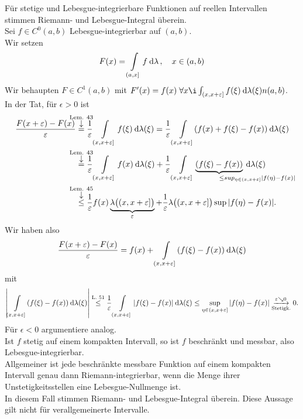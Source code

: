\documentclass[skript.tex]{subfiles}
\begin{document}
	\begin{bem}
		Für stetige und Lebesgue-integrierbare Funktionen auf reellen Intervallen stimmen
		Riemann- und Lebesgue-Integral überein. \\
		Sei $f \in C^0 (a,b)$ Lebesgue-integrierbar auf $(a,b)$. \\
		Wir setzen
		\[
			F(x) = \int\limits_{(a,x]} f \: \mathrm{d}\lambda\,, \quad x \in (a,b)
		\]
		Wir behaupten $F \in C^1(a,b)$ mit $F'(x) = f(x) \; \forall x \i\int_{(x,x+\epsilon]} f(\xi) \md \lambda(\xi)n (a,b)$. \\ 
		In der Tat, für $\epsilon > 0$ ist
		\begin{align*}
			\frac{F(x+\epsilon)-F(x)}{\epsilon} &\darrow{\text{Lem. 43}}{=}
			\frac{1}{\epsilon} \lint_{(x,x+\epsilon]} f(\xi) \md \lambda(\xi)
			= \frac{1}{\epsilon} \lint_{(x,x+\epsilon]} (f(x)+f(\xi)-f(x)) \md \lambda(\xi)
			\\ &\darrow{\text{Lem. 43}}{=}
			\frac{1}{\epsilon}\lint_{(x,x+\epsilon]} f(x) \md \lambda(\xi)
			+ \frac{1}{\epsilon}\lint_{(x,x+\epsilon]} 
			\underbrace{(f(\xi)-f(x))}_{
				\mathrlap{
					\leq sup_{\eta\in(x,x+\epsilon]} |f(\eta)-f(x)|
				}
			}
			\md \lambda(\xi) \\
			&\darrow{\text{Lem. 45}}{\leq}
			\frac{1}{\epsilon} f(x)
			\underbrace{\lambda\big((x,x+\epsilon]\big)}_\epsilon
			+ \frac{1}{\epsilon} \lambda\big((x,x+\epsilon]\big) \sup | f(\eta)-f(x)|.
		\end{align*}
		Wir haben also
		\[
			\frac{F(x+\varepsilon)-F(x)}{\varepsilon}
			= f(x) + \int\limits_{(x,x+\varepsilon]}(f(\xi)-f(x)) \: \mathrm{d} \lambda(\xi)
		\]
		mit
		\[
			\left|\int\limits_{(x,x+\varepsilon]}(f(\xi)-f(x)) \: \mathrm{d} \lambda(\xi)\right|
			\overset{\text{L. 51}}{\leq}
			\frac{1}{\varepsilon} \int\limits_{(x,x+\varepsilon]}|f(\xi)-f(x)| \: \mathrm{d} \lambda(\xi)
			\leq \sup_{\eta\in(x,x+\varepsilon]} |f(\eta)-f(x)|
			\underset{\text{Stetigk.}}{\xrightarrow{\varepsilon\searrow 0}} 0.
		\]
		Für $\epsilon < 0$ argumentiere analog. \\
		Ist $f$ stetig auf einem kompakten Intervall, so ist $f$ beschränkt und messbar,
		also Lebesgue-integrierbar.\\
		
		Allgemeiner ist jede beschränkte messbare Funktion auf einem kompakten
		Intervall genau dann Riemann-integrierbar, wenn die Menge ihrer Unstetigkeitsstellen eine Lebesgue-Nullmenge ist. \\
		In diesem Fall stimmen Riemann- und Lebesgue-Integral überein. Diese Aussage gilt nicht für verallgemeinerte Intervalle.
	\end{bem}
\end{document}
